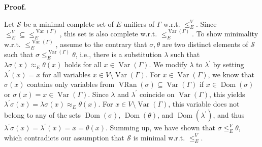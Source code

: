  
\par\medskip\noindent\textbf{Proof.}\par
 
 
Let $\mathcal{S}$ be a minimal complete set of $E$-unifiers of $\Gamma$ w.r.t. $\leq_{E}^{V}$. Since ${\leq_{E}^{V}}\subseteq{\leq_{E}^{\operatorname{Var}(\Gamma)}}$, this set is also complete w.r.t. $\leq_{E}^{\operatorname{Var}(\Gamma)}$. To show minimality w.r.t. $\leq_{E}^{\operatorname{Var}(\Gamma)}$, assume to the contrary that $\sigma,\theta$ are two distinct elements of $\mathcal{S}$ such that $\sigma\leq_{E}^{\operatorname{Var}(\Gamma)}\theta$, i.e., there is a substitution $\lambda$ such that $\lambda\sigma(x)\approx_{E}\theta(x)$ holds for all $x\in\operatorname{Var}(\Gamma)$. We modify $\lambda$ to $\lambda^{\prime}$ by setting $\lambda^{\prime}(x)=x$ for all variables $x\in V\setminus\operatorname{Var}(\Gamma)$. For $x\in\operatorname{Var}(\Gamma)$, we know that $\sigma(x)$ contains only variables from $\operatorname{VRan}(\sigma)\subseteq\operatorname{Var}(\Gamma)$ if $x\in\operatorname{Dom}(\sigma)$ or $\sigma(x)=x\in\operatorname{Var}(\Gamma)$. Since $\lambda$ and $\lambda^{\prime}$ coincide on $\operatorname{Var}(\Gamma)$, this yields $\lambda^{\prime}\sigma(x)=\lambda\sigma(x)\approx_{E}\theta(x)$. For $x\in V\setminus\operatorname{Var}(\Gamma)$, this variable does not belong to any of the sets $\operatorname{Dom}(\sigma)$, $\operatorname{Dom}(\theta)$, and $\operatorname{Dom}(\lambda^{\prime})$, and thus $\lambda^{\prime}\sigma(x)=\lambda^{\prime}(x)=x=\theta(x)$. Summing up, we have shown that $\sigma\leq_{E}^{V}\theta$, which contradicts our assumption that $\mathcal{S}$ is minimal w.r.t. $\leq_{E}^{V}$.\par
 
 
 
